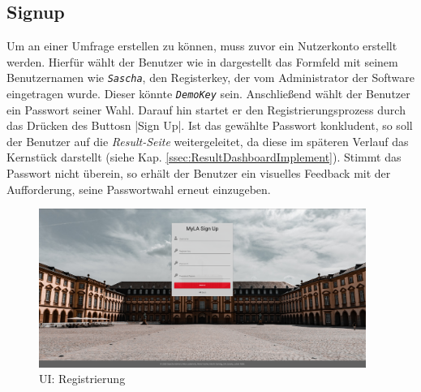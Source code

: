
\subsection{Signup}
\label{ssec:Signup}

Um an einer Umfrage erstellen zu können, muss zuvor ein Nutzerkonto erstellt werden. 
Hierfür wählt der Benutzer wie in \abb {} dargestellt das Formfeld mit seinem Benutzernamen wie \zb \emph{\texttt{Sascha}}, den Registerkey, der vom Administrator der Software eingetragen wurde. Dieser könnte \emph{\texttt{DemoKey}} sein.
Anschließend wählt der Benutzer ein Passwort seiner Wahl.
Darauf hin startet er den Registrierungsprozess durch das Drücken des Buttosn \jinline|Sign Up|.
Ist das gewählte Passwort konkludent, so soll der Benutzer auf die \emph{Result-Seite} weitergeleitet, da diese im späteren Verlauf \ua das Kernstück darstellt (siehe Kap. \vref{ssec:ResultDashboardImplement}). 
Stimmt das Passwort nicht überein, so erhält der Benutzer ein visuelles Feedback mit der Aufforderung, seine Passwortwahl erneut einzugeben. 

\begin{figure}[hp]
	\centering
	\includegraphics[width=0.95\textwidth, keepaspectratio]{img/client/Signup.png}
	\captionsetup{justification=centering, format=plain}
	\caption[\acf{UI}: Registrierung]{\acf{UI}: Registrierung \\ \quelleScreenshot}
	\label{fig:SignupImplement}
\end{figure}